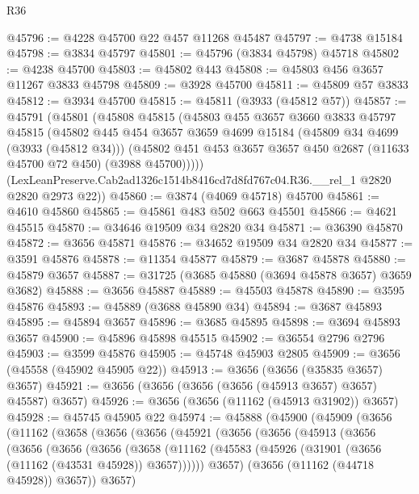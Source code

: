 \begin{lexlean}{R36}
\begin{coremodule}
@45796 := @4228 @45700 @22 @457 @11268 @45487
@45797 := @4738 @15184
@45798 := @3834 @45797
@45801 := @45796 (@3834 @45798) @45718
@45802 := @4238 @45700
@45803 := @45802 @443
@45808 := @45803 @456 @3657 @11267 @3833 @45798
@45809 := @3928 @45700
@45811 := @45809 @57 @3833
@45812 := @3934 @45700
@45815 := @45811 (@3933 (@45812 @57))
@45857 := @45791
    (@45801
      (@45808
        @45815
        (@45803
          @455
          @3657
          @3660
          @3833
          @45797
          @45815
          (@45802
            @445
            @454
            @3657
            @3659
            @4699
            @15184
            (@45809 @34 @4699 (@3933 (@45812 @34)))
            (@45802 @451 @453 @3657 @3657 @450 @2687 (@11633 @45700 @72 @450) (@3988 @45700)))))
      (LexLeanPreserve.Cab2ad1326c1514b8416cd7d8fd767c04.R36.__rel_1 @2820 @2820 @2973 @22))
@45860 := @3874 (@4069 @45718) @45700
@45861 := @4610 @45860
@45865 := @45861 @483 @502 @663 @45501
@45866 := @4621 @45515
@45870 := @34646 @19509 @34 @2820 @34
@45871 := @36390 @45870
@45872 := @3656 @45871
@45876 := @34652 @19509 @34 @2820 @34
@45877 := @3591 @45876
@45878 := @11354 @45877
@45879 := @3687 @45878
@45880 := @45879 @3657
@45887 := @31725 (@3685 @45880 (@3694 @45878 @3657) @3659 @3682)
@45888 := @3656 @45887
@45889 := @45503 @45878
@45890 := @3595 @45876
@45893 := @45889 (@3688 @45890 @34)
@45894 := @3687 @45893
@45895 := @45894 @3657
@45896 := @3685 @45895
@45898 := @3694 @45893 @3657
@45900 := @45896 @45898 @45515
@45902 := @36554 @2796 @2796
@45903 := @3599 @45876
@45905 := @45748 @45903 @2805
@45909 := @3656 (@45558 (@45902 @45905 @22))
@45913 := @3656 (@3656 (@35835 @3657) @3657)
@45921 := @3656 (@3656 (@3656 (@3656 (@45913 @3657) @3657) @45587) @3657)
@45926 := @3656 (@3656 (@11162 (@45913 @31902)) @3657)
@45928 := @45745 @45905 @22
@45974 := @45888
    (@45900
      (@45909
        (@3656
          (@11162
            (@3658
              (@3656
                (@3656
                  (@45921
                    (@3656
                      (@3656
                        (@45913
                          (@3656
                            (@3656
                              (@3656
                                (@3656
                                  (@3658
                                    (@11162
                                      (@45583
                                        (@45926 (@31901 (@3656 (@11162 (@43531 @45928)) @3657))))))
                                  @3657)
                                (@3656 (@11162 (@44718 @45928)) @3657))
                              @3657)

\end{coremodule}
\end{lexlean}
